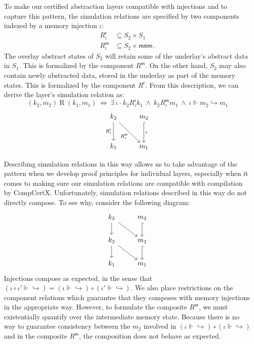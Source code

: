 \documentclass[11pt,oneside]{book}
\theoremstyle{definition}
\newcommand{\kw}[1]{\ensuremath{ \mathsf{#1} }}
\newcommand{\bdot}{\boldsymbol{\cdot}}
\begin{document}
To make our certified abstraction layers compatible
with injections and to capture this pattern,
the simulation relations are specified by two components
indexed by a memory injection $\iota$:
\begin{align*}
  R^\kw{r}_\iota &\subseteq S_2 \times S_1 \\
  R^\kw{m}_\iota &\subseteq S_2 \times \kw{mem}
  \,.
\end{align*}
The overlay abstract states of $S_2$
will retain some of the underlay's abstract data in $S_1$.
This is formalized by
the component $R^\kw{m}$.
On the other hand,
$S_2$ may also contain newly abstracted data,
stored in the underlay as part of the memory states.
This is formalized by the component $R^\kw{r}$.
From this description,
we can derive the layer's simulation relation
as:
\[
  (k_2, m_2) \mathrel{R} (k_1, m_1)
  \: \Leftrightarrow \:
  \exists \, \iota \:\bdot\:
    k_2 \mathrel{R^\kw{r}_\iota} k_1 \:\wedge\:
    k_2 \mathrel{R^\kw{m}_\iota} m_1 \:\wedge\:
    \iota \Vdash m_2 \hookrightarrow m_1
\]
\[
  \begin{tikzcd}[row sep=large]
    k_2 \ar[d, "R^\kw{r}_\iota"']
        \ar[dr, "R^\kw{m}_\iota"'] &
    m_2 \ar[d, hook, "\iota"] \\
    k_1 & m_1
  \end{tikzcd}
\]

Describing simulation relations in this way
allows us to take advantage of the pattern
when we develop proof principles for
individual layers,
especially when it comes to
making sure our simulation
relations are compatible with
compilation by CompCertX.
Unfortunately,
simulation relations described in this way
do not directly compose.
To see why,
consider the following diagram:
\[
  \begin{tikzcd}
    k_3 \ar[d] \ar[dr] & m_3 \ar[d, hook] \\
    k_2 \ar[d] \ar[dr] & m_2 \ar[d, hook] \\
    k_1 & m_1
  \end{tikzcd}
\]
Injections compose as expected,
in the sense that
$(\iota \circ \iota' \Vdash {\hookrightarrow}) =
 (\iota \Vdash {\hookrightarrow}) \circ
 (\iota' \Vdash {\hookrightarrow})$.
We also place restrictions on the component
relations
which guarantee that they composes with memory injections
in the appropriate way.
However,
to formulate the composite $R^\kw{m}$,
we must existentially quantify
over the intermediate memory state.
Because there is no way to guarantee consistency between
the $m_2$ involved in
$(\iota \Vdash {\hookrightarrow}) \circ
 (\iota \Vdash {\hookrightarrow})$
and in the composite $R^\kw{m}$,
the composition does not behave as expected.
\end{document}
